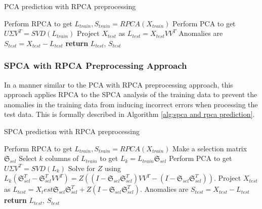 \documentclass[conference]{IEEEtran}
\begin{document}
\begin{algorithm}
\caption{PCA prediction with RPCA preprocessing}\label{alg:pca and rpca prediction}
\begin{algorithmic}[1]
\State Perform RPCA to get $L_{train}, S_{train} = RPCA(X_{train})$
\State Perform PCA to get $U \Sigma V^T = SVD(L_{train})$
\State Project $X_{test}$ as $L_{test} = X_{test} V V^T$
\State Anomalies are $S_{test} = X_{test} - L_{test}$
\State \textbf{return} $L_{test}$, $S_{test}$
\EndProcedure
\end{algorithmic}
\end{algorithm}
\subsubsection{SPCA with RPCA Preprocessing Approach}
In a manner similar to the  PCA with RPCA preprocessing approach, this approach applies RPCA to the SPCA analysis of the training data to prevent the anomalies in the training data from inducing incorrect errors when processing the test data.  This is formally described in Algorithm \ref {alg:spca and rpca prediction}.

\begin{algorithm}
\caption{SPCA prediction with RPCA preprocessing}\label{alg:spca and rpca prediction}
\begin{algorithmic}[1]
\State Perform RPCA to get $L_{train}, S_{train} = RPCA(X_{train})$
\State Make a selection matrix $\mathfrak{S}_{sel}$
\State Select $k$ columns of $L_{train}$ to get $L_k = L_{train} \mathfrak{S}_{sel}$
\State Perform PCA to get $U \Sigma V^T = SVD(L_k)$
\State Solve for $Z$ using $L_k (\mathfrak{S}_{sel}^T - \mathfrak{S}_{sel}^T V V^T) = Z ((I-\mathfrak{S}_{sel} \mathfrak{S}_{sel}^T)V V^T - (I-\mathfrak{S}_{sel} \mathfrak{S}_{sel}^T))$.
\State Project $X_{test}$ as $L_{test} = X_test \mathfrak{S}_{sel} \mathfrak{S}_{sel}^T + Z (I-\mathfrak{S}_{sel} \mathfrak{S}_{sel}^T)$.
\State Anomalies are $S_{test} = X_{test} - L_{test}$
\State \textbf{return} $L_{test}$, $S_{test}$
\EndProcedure
\end{algorithmic}
\end{algorithm}
\end{document}
